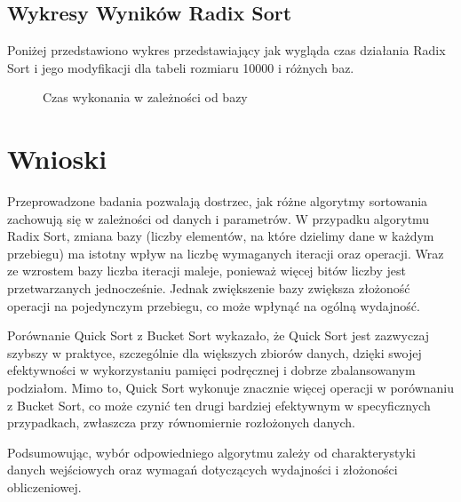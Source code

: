 \documentclass[a4paper,12pt]{article}
\begin{document}
\subsection{Wykresy Wyników Radix Sort}
Poniżej przedstawiono wykres przedstawiający jak wygląda czas działania Radix Sort i jego modyfikacji dla tabeli rozmiaru 10000 i różnych baz.
\newpage
\begin{figure}[H]
    \centering
    \caption{Czas wykonania w zależności od bazy}
\end{figure}
\newpage
\section{Wnioski}

Przeprowadzone badania pozwalają dostrzec, jak różne algorytmy sortowania zachowują się w zależności od danych i parametrów. W przypadku algorytmu Radix Sort, zmiana bazy (liczby elementów, na które dzielimy dane w każdym przebiegu) ma istotny wpływ na liczbę wymaganych iteracji oraz operacji. Wraz ze wzrostem bazy liczba iteracji maleje, ponieważ więcej bitów liczby jest przetwarzanych jednocześnie. Jednak zwiększenie bazy zwiększa złożoność operacji na pojedynczym przebiegu, co może wpłynąć na ogólną wydajność.

Porównanie Quick Sort z Bucket Sort wykazało, że Quick Sort jest zazwyczaj szybszy w praktyce, szczególnie dla większych zbiorów danych, dzięki swojej efektywności w wykorzystaniu pamięci podręcznej i dobrze zbalansowanym podziałom. Mimo to, Quick Sort wykonuje znacznie więcej operacji w porównaniu z Bucket Sort, co może czynić ten drugi bardziej efektywnym w specyficznych przypadkach, zwłaszcza przy równomiernie rozłożonych danych.

Podsumowując, wybór odpowiedniego algorytmu zależy od charakterystyki danych wejściowych oraz wymagań dotyczących wydajności i złożoności obliczeniowej.
\end{document}
